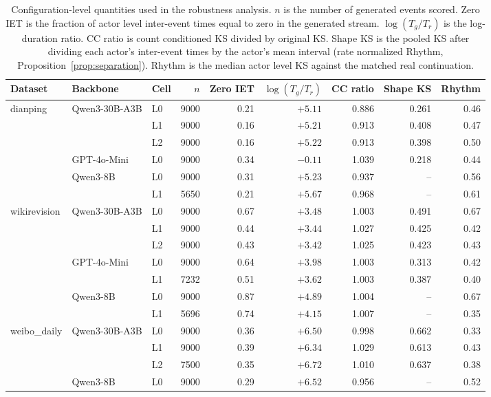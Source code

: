\begin{table}[h]
\caption{Configuration-level quantities used in the robustness analysis. $n$ is the number of generated events scored. Zero IET is the fraction of actor level inter-event times equal to zero in the generated stream. $\log(T_g/T_r)$ is the log-duration ratio. CC ratio is count conditioned KS divided by original KS. Shape KS is the pooled KS after dividing each actor's inter-event times by the actor's mean interval (rate normalized Rhythm, Proposition~\ref{prop:separation}). Rhythm is the median actor level KS against the matched real continuation.}
\label{tab:artifact-controls}
\centering\footnotesize
\begin{tabular}{lllrrrrrr}
\toprule
Dataset & Backbone & Cell & $n$ & Zero IET & $\log(T_g/T_r)$ & CC ratio & Shape KS & Rhythm \\
\midrule
dianping & Qwen3-30B-A3B & L0 & 9000 & 0.21 & $+5.11$ & 0.886 & 0.261 & 0.46 \\
 &  & L1 & 9000 & 0.16 & $+5.21$ & 0.913 & 0.408 & 0.47 \\
 &  & L2 & 9000 & 0.16 & $+5.22$ & 0.913 & 0.398 & 0.50 \\
 & GPT-4o-Mini & L0 & 9000 & 0.34 & $-0.11$ & 1.039 & 0.218 & 0.44 \\
 & Qwen3-8B & L0 & 9000 & 0.31 & $+5.23$ & 0.937 & -- & 0.56 \\
 &  & L1 & 5650 & 0.21 & $+5.67$ & 0.968 & -- & 0.61 \\
wikirevision & Qwen3-30B-A3B & L0 & 9000 & 0.67 & $+3.48$ & 1.003 & 0.491 & 0.67 \\
 &  & L1 & 9000 & 0.44 & $+3.44$ & 1.027 & 0.425 & 0.42 \\
 &  & L2 & 9000 & 0.43 & $+3.42$ & 1.025 & 0.423 & 0.43 \\
 & GPT-4o-Mini & L0 & 9000 & 0.64 & $+3.98$ & 1.003 & 0.313 & 0.42 \\
 &  & L1 & 7232 & 0.51 & $+3.62$ & 1.003 & 0.387 & 0.40 \\
 & Qwen3-8B & L0 & 9000 & 0.87 & $+4.89$ & 1.004 & -- & 0.67 \\
 &  & L1 & 5696 & 0.74 & $+4.15$ & 1.007 & -- & 0.35 \\
weibo\_daily & Qwen3-30B-A3B & L0 & 9000 & 0.36 & $+6.50$ & 0.998 & 0.662 & 0.33 \\
 &  & L1 & 9000 & 0.39 & $+6.34$ & 1.029 & 0.613 & 0.43 \\
 &  & L2 & 7500 & 0.35 & $+6.72$ & 1.010 & 0.637 & 0.38 \\
 & Qwen3-8B & L0 & 9000 & 0.29 & $+6.52$ & 0.956 & -- & 0.52 \\

\end{tabular}
\end{table}

